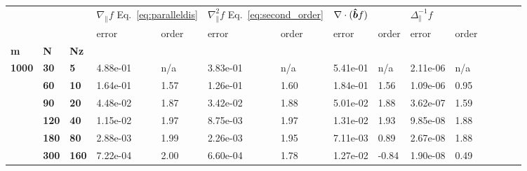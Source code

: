 \begin{tabular}{lllllllllllllll}
\toprule
  &     &     & \multicolumn{2}{l}{$\nabla_\parallel f$
  Eq.~\eqref{eq:paralleldis}} &
  \multicolumn{2}{l}{$\nabla_\parallel^2 f$ Eq.~\eqref{eq:second_order}} &
  \multicolumn{2}{l}{$\nabla\cdot(\bm{\hat{b}} f)$} &
  \multicolumn{2}{l}{$\Delta_\parallel^{-1}f $} \\
     &     &     &     error & order &     error & order &       error &  order &          error & order \\
\textbf{m} & \textbf{N} & \textbf{Nz} &           &       &           &       &             &        &                &       \\
\midrule
\textbf{1000} & \textbf{30 } & \textbf{5  } &  4.88e-01 &   n/a &  3.83e-01 &   n/a &    5.41e-01 &    n/a &       2.11e-06 &   n/a \\
              & \textbf{60 } & \textbf{10 } &  1.64e-01 &  1.57 &  1.26e-01 &  1.60 &    1.84e-01 &   1.56 &       1.09e-06 &  0.95 \\
              & \textbf{90 } & \textbf{20 } &  4.48e-02 &  1.87 &  3.42e-02 &  1.88 &    5.01e-02 &   1.88 &       3.62e-07 &  1.59 \\
              & \textbf{120} & \textbf{40 } &  1.15e-02 &  1.97 &  8.75e-03 &  1.97 &    1.31e-02 &   1.93 &       9.85e-08 &  1.88 \\
              & \textbf{180} & \textbf{80 } &  2.88e-03 &  1.99 &  2.26e-03 &  1.95 &    7.11e-03 &   0.89 &       2.67e-08 &  1.88 \\
              & \textbf{300} & \textbf{160} &  7.22e-04 &  2.00 &  6.60e-04 &  1.78 &    1.27e-02 &  -0.84 &       1.90e-08 &  0.49 \\
\bottomrule
\end{tabular}

